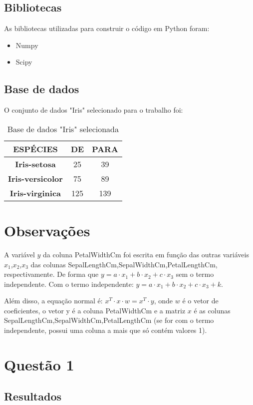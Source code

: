 \documentclass[a4paper,12pt,twoside]{article}
\begin{document}
\subsection{Bibliotecas}
As bibliotecas utilizadas para construir o código em Python foram:
\begin{itemize}
   \item Numpy
   \item Scipy
 \end{itemize}
 \subsection{Base de dados}
 O  conjunto de dados "Iris" selecionado para o trabalho foi:
 \begin{table}[H]
\begin{tabular}{|c|c|c|} \hline
\textbf{ESPÉCIES} & DE & PARA \\\hline
\textbf{Iris-setosa}  & 25 & 39 \\\hline
\textbf{Iris-versicolor} & 75 & 89  \\\hline
\textbf{Iris-virginica} & 125 & 139 \\\hline

 
\end{tabular}
\label{tabela2}
\centering
\caption{Base de dados "Iris" selecionada}
\label {tabela2}
\end{table}

\section{Observações}
A variável $y$ da coluna PetalWidthCm foi escrita em função das outras variáveis $x_{1}$,$x_{2}$,$x_{3}$ das colunas SepalLengthCm,SepalWidthCm,PetalLengthCm, respectivamente. De forma que 
$y= a\cdot x_{1} +b\cdot x_{2}+c\cdot x_{3}$ sem o termo independente. Com o termo independente: $y= a\cdot x_{1} +b\cdot x_{2}+c\cdot x_{3} +k$.

    Além disso, a equação normal é: $x^{T}\cdot x\cdot w=x^{T}\cdot y$, onde $w$ é o vetor de coeficientes, o vetor y é a coluna PetalWidthCm e a matriz $x$ é as colunas SepalLengthCm,SepalWidthCm,PetalLengthCm (se for com o termo independente, possui uma coluna a mais que só contém valores 1).


\section{Questão 1}
\subsection{Resultados}
\end{document}
